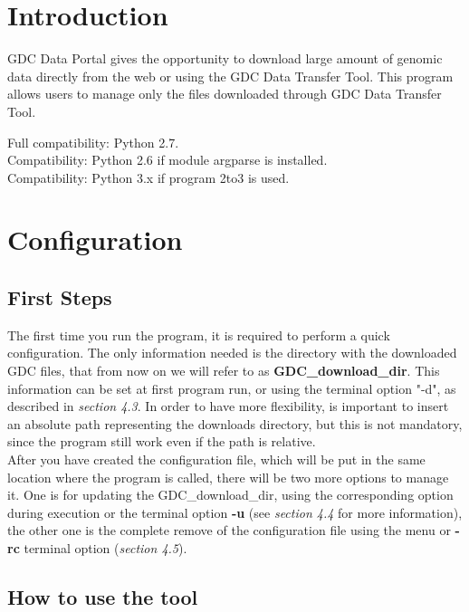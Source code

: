 \documentclass[hidelinks,12pt]{article}
\begin{document}

\tableofcontents
\pagebreak


\section{Introduction}

GDC Data Portal gives the opportunity to download large amount of genomic data directly from the web or using the GDC Data Transfer Tool. 
This program allows users to manage only the files downloaded through GDC Data Transfer Tool.

Full compatibility: Python 2.7.\\
Compatibility: Python 2.6 if module argparse is installed.\\
Compatibility: Python 3.x if program 2to3 is used.

\section{Configuration}
\subsection{First Steps}
The first time you run the program, it is required to perform a quick configuration.
The only information needed is the directory with the downloaded GDC files, that from now on we will refer to as \textbf{GDC\_download\_dir}.
This information can be set at first program run, or using the terminal option "-d", as described in \textit{section 4.3}.
In order to have more flexibility, is important to insert an absolute path representing the downloads directory, but this is not mandatory, since the program still work even if the path is relative.\\
After you have created the configuration file, which will be put in the same location where the program is called, there will be two more options to manage it.
One is for updating the GDC\_download\_dir, using the corresponding option during execution or the terminal option \textbf{-u} (see \emph{section 4.4} for more information), the other one is the complete remove of the configuration file using the menu or \textbf{-rc} terminal option (\textit{section 4.5}).

\subsection{How to use the tool}
\end{document}
